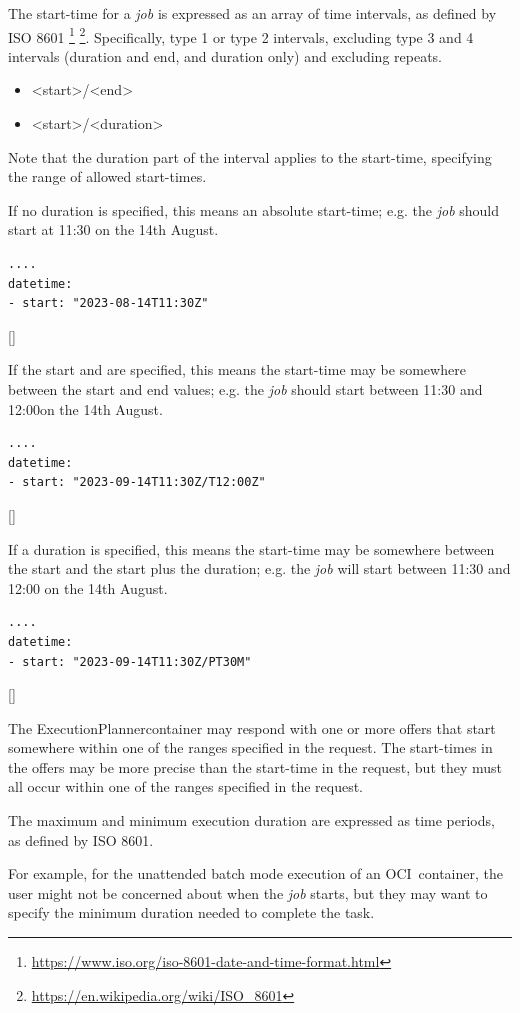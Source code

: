 \documentclass[11pt,a4paper]{ivoa}
\newcommand{\execplanner} {ExecutionPlanner}
\newcommand{\ocicontainer} {OCI~container}
\newcommand{\footurl}[1] {\footnote{\url{#1}}}
\newcommand{\job} {\textit{job}}
\begin{document}
The start-time for a \job{} is expressed as an array of time intervals, as defined by
ISO 8601\citep{std:iso8601}
\footurl{https://www.iso.org/iso-8601-date-and-time-format.html}
\footurl{https://en.wikipedia.org/wiki/ISO_8601}.
Specifically, type 1 or type 2 intervals, excluding type 3 and 4 intervals
(duration and end, and duration only) and excluding repeats.

\begin{itemize}
    \item <start>/<end>
    \item <start>/<duration>
\end{itemize}

Note that the duration part of the interval applies to the start-time, specifying the
range of allowed start-times.

If no duration is specified, this means an absolute start-time;
e.g. the \job{} should start at 11:30 on the 14th August.
\begin{lstlisting}[]
....
datetime:
- start: "2023-08-14T11:30Z"
\end{lstlisting}[]

If the start and are specified, this means the start-time may be somewhere between
the start and end values;
e.g. the \job{} should start between 11:30 and 12:00on the 14th August.
\begin{lstlisting}[]
....
datetime:
- start: "2023-09-14T11:30Z/T12:00Z"
\end{lstlisting}[]

If a duration is specified, this means the start-time may be somewhere between the
start and the start plus the duration;
e.g. the \job{} will start between 11:30 and 12:00 on the 14th August.
\begin{lstlisting}[]
....
datetime:
- start: "2023-09-14T11:30Z/PT30M"
\end{lstlisting}[]

The \execplanner container may respond with one or more offers that start somewhere
within one of the ranges specified in the request.
The start-times in the offers may be more precise than the start-time in the request,
but they must all occur within one of the ranges specified in the request.

The maximum and minimum execution duration are expressed as time periods, as defined by ISO 8601.

For example, for the unattended batch mode execution of an \ocicontainer, the user might not be concerned about
when the \job{} starts, but they may want to specify the minimum duration needed to complete the task.
\end{document}
